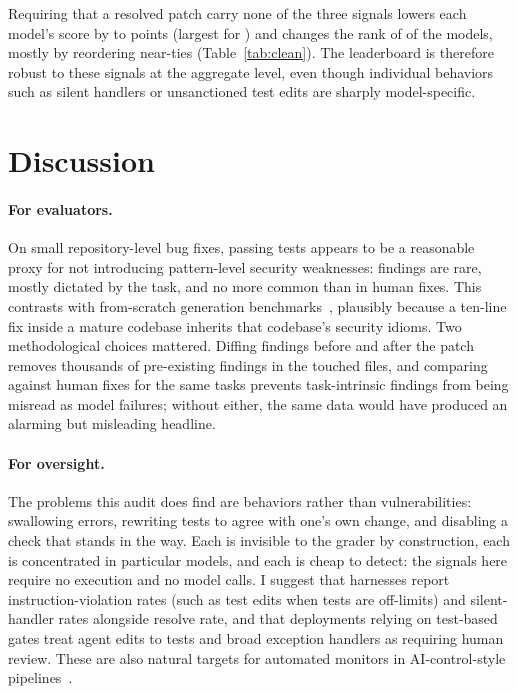\documentclass[10pt]{article}
\begin{document}
Requiring that a resolved patch carry none of the three signals lowers each model's score by \CleanDropMinPts{} to \CleanDropMaxPts{} points (largest for \CleanDropMaxName) and changes the rank of \NRankChanged{} of the \NModels{} models, mostly by reordering near-ties (Table~\ref{tab:clean}). The leaderboard is therefore robust to these signals at the aggregate level, even though individual behaviors such as silent handlers or unsanctioned test edits are sharply model-specific.

\section{Discussion}

\paragraph{For evaluators.} On small repository-level bug fixes, passing tests appears to be a reasonable proxy for not introducing pattern-level security weaknesses: findings are rare, mostly dictated by the task, and no more common than in human fixes. This contrasts with from-scratch generation benchmarks~\citep{vero2025baxbench,pearce2022asleep}, plausibly because a ten-line fix inside a mature codebase inherits that codebase's security idioms. Two methodological choices mattered. Diffing findings before and after the patch removes thousands of pre-existing findings in the touched files, and comparing against human fixes for the same tasks prevents task-intrinsic findings from being misread as model failures; without either, the same data would have produced an alarming but misleading headline.

\paragraph{For oversight.} The problems this audit does find are behaviors rather than vulnerabilities: swallowing errors, rewriting tests to agree with one's own change, and disabling a check that stands in the way. Each is invisible to the grader by construction, each is concentrated in particular models, and each is cheap to detect: the signals here require no execution and no model calls. I suggest that harnesses report instruction-violation rates (such as test edits when tests are off-limits) and silent-handler rates alongside resolve rate, and that deployments relying on test-based gates treat agent edits to tests and broad exception handlers as requiring human review. These are also natural targets for automated monitors in AI-control-style pipelines~\citep{greenblatt2024control}.
\end{document}
